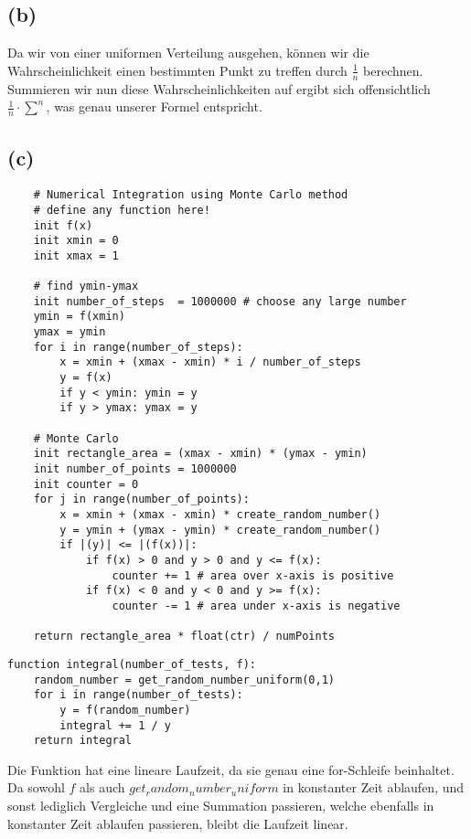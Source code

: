 \documentclass[a4paper]{scrartcl}
\begin{document}
\subsection*{(b)}
Da wir von einer uniformen Verteilung ausgehen, können wir die Wahrscheinlichkeit einen bestimmten Punkt zu treffen durch $\frac{1}{n}$ berechnen.\\ 
Summieren wir nun diese Wahrscheinlichkeiten auf ergibt sich offensichtlich $\frac{1}{n} \cdot \sum_{}^{n}$, was genau unserer Formel entspricht.



\subsection*{(c)}
\begin{lstlisting}
	# Numerical Integration using Monte Carlo method
	# define any function here!
	init f(x)
	init xmin = 0
	init xmax = 1
	
	# find ymin-ymax
	init number_of_steps  = 1000000 # choose any large number
	ymin = f(xmin)
	ymax = ymin
	for i in range(number_of_steps):
		x = xmin + (xmax - xmin) * i / number_of_steps
		y = f(x)
		if y < ymin: ymin = y
		if y > ymax: ymax = y
		
	# Monte Carlo
	init rectangle_area = (xmax - xmin) * (ymax - ymin)
	init number_of_points = 1000000
	init counter = 0
	for j in range(number_of_points):
		x = xmin + (xmax - xmin) * create_random_number()
		y = ymin + (ymax - ymin) * create_random_number()
		if |(y)| <= |(f(x))|:
			if f(x) > 0 and y > 0 and y <= f(x):
				counter += 1 # area over x-axis is positive
			if f(x) < 0 and y < 0 and y >= f(x):
				counter -= 1 # area under x-axis is negative
	
	return rectangle_area * float(ctr) / numPoints
\end{lstlisting}


\begin{lstlisting}
function integral(number_of_tests, f):
	random_number = get_random_number_uniform(0,1)
	for i in range(number_of_tests):
		y = f(random_number)
		integral += 1 / y
	return integral
\end{lstlisting}
Die Funktion hat eine lineare Laufzeit, da sie genau eine for-Schleife beinhaltet. Da sowohl $f$ als auch $get_random_number_uniform$ in konstanter Zeit ablaufen, und sonst lediglich Vergleiche und eine Summation passieren, welche ebenfalls in konstanter Zeit ablaufen passieren, bleibt die Laufzeit linear.
\end{document}
